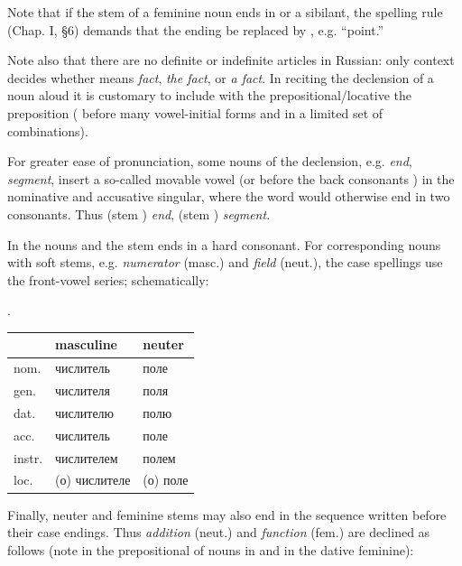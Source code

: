 Note that if the stem of a feminine noun ends in  or a sibilant, the spelling rule (Chap. I, §6) demands that the ending  be replaced by , e.g.  ``point.''

Note also that there are no definite or indefinite articles in Russian: only context decides whether  means \emph{fact}, \emph{the fact}, or \emph{a fact}. In reciting the declension of a noun aloud it is customary to include with the prepositional/locative the preposition  ( before many vowel-initial forms and  in a limited set of combinations).

For greater ease of pronunciation, some nouns of the  declension, e.g.  \emph{end},  \emph{segment}, insert a so-called movable vowel  (or  before the back consonants ) in the nominative and accusative singular, where the word would otherwise end in two consonants. Thus  (stem ) \emph{end},  (stem ) \emph{segment}.

In the nouns  and  the stem ends in a hard consonant. For corresponding nouns with soft stems, e.g.  \emph{numerator} (masc.) and  \emph{field} (neut.), the case spellings use the front-vowel series; schematically:
\begin{center}
.
\end{center}

\begin{center}
\small
\begin{tabular}{@{}l >{\cyrillicfont}l >{\cyrillicfont}l@{}}
\toprule
& masculine & neuter\\
\midrule
nom. & числитель & поле\\
gen. & числителя & поля\\
dat. & числителю & полю\\
acc. & числитель & поле\\
instr. & числителем & полем\\
loc. & (о) числителе & (о) поле\\
\bottomrule
\end{tabular}
\end{center}

Finally, neuter and feminine stems may also end in the sequence written  before their case endings. Thus  \emph{addition} (neut.) and  \emph{function} (fem.) are declined as follows (note  in the prepositional of nouns in  and in the dative feminine):

